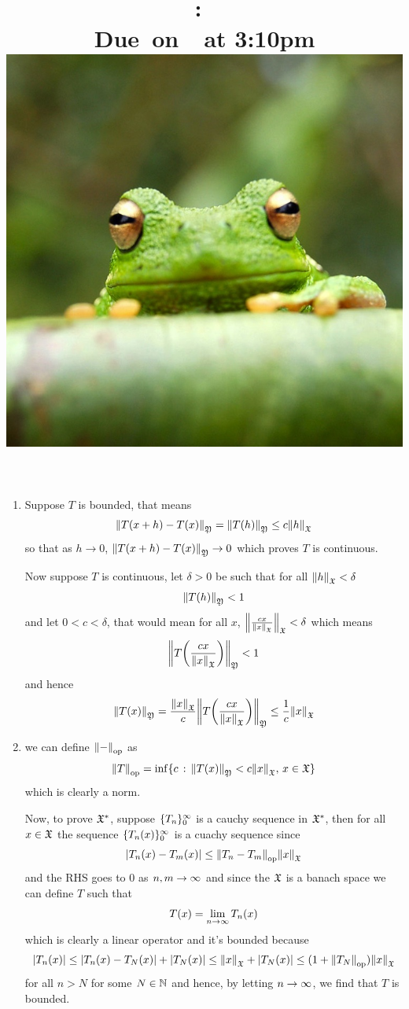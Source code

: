 \documentclass{article}
\title{
    \vspace{2in}
    \textmd{\textbf{\hmwkClass:\ \hmwkTitle}}\\
    \normalsize\vspace{0.1in}\small{Due\ on\ \hmwkDueDate\ at 3:10pm}\\
    \includegraphics[scale=0.2]{frog} \\
    \vspace{0.1in}\large{\textit{\hmwkClassTime}}
    \vspace{3in}
}
\author{\hmwkAuthorName}
\date{}
\begin{document}
\maketitle

\pagebreak
\begin{homeworkProblem}
    \begin{enumerate}[label=\alph*.]
        \item Suppose $T$ is bounded, that means
        \[\norm{T(x+h)-T(x)}_{\mfk{Y}}=\norm{T(h)}_\mfk{Y}\leq c\norm{h}_\mfk{X}\]
        so that as $h\to 0$, $\norm{T(x+h)-T(x)}_{\mfk{Y}}\to 0$ which proves $T$ is continuous.

        Now suppose $T$ is continuous, let $\delta>0$ be such that for all $\norm{h}_\mfk{X}<\delta$
        \[\norm{T(h)}_\mfk{Y}<1\]
        and let $0<c<\delta$, that would mean for all $x$, $\norm{\frac{cx}{\norm{x}_\mfk{X}}}_\mfk{X}<\delta$ which means
        \[\norm{T\bigg(\frac{cx}{\norm{x}_\mfk{X}}\bigg)}_\mfk{Y}<1\]
        and hence
        \[\norm{T(x)}_\mfk{Y}=\frac{\norm{x}_\mfk{X}}{c}\norm{T\bigg(\frac{cx}{\norm{x}_\mfk{X}}\bigg)}_\mfk{Y} \leq \frac{1}{c}\norm{x}_\mfk{X}\]
        \item we can define $\norm{-}_{\operatorname{op}}$ as
        \[\norm{T}_{\operatorname{op}} = \inf\{c\,:\,\norm{T(x)}_\mfk{Y}<c\norm{x}_\mfk{X},\, x\in\mfk{X}\}\]
        which is clearly a norm.

        Now, to prove $\mathfrak{X}^*$, suppose $\{T_n\}_0^\infty$ is a cauchy sequence in $\mathfrak{X}^*$, then for all $x\in\mathfrak{X}$ the sequence $\{T_n(x)\}_0^\infty$ is a cuachy sequence since
        \[\abs{T_n(x)-T_m(x)}\leq \norm{T_n-T_m}_{\operatorname{op}}\norm{x}_\mfk{X}\]
        and the RHS goes to 0 as $n,m\to\infty$ and since the $\mathfrak{X}$ is a banach space we can define $T$ such that
        \[T(x)=\lim_{n\to\infty}T_n(x)\]
        which is clearly a linear operator and it's bounded because
        \[\abs{T_n(x)} \leq \abs{T_n(x)-T_N(x)}+\abs{T_N(x)}\leq\norm{x}_\mfk{X}+\abs{T_N(x)} \leq (1+\norm{T_N}_{\operatorname{op}})\norm{x}_\mfk{X}\]
        for all $n>N$ for some $N\in\mathbb{N}$ and hence, by letting $n\to\infty$, we find that $T$ is bounded.
    \end{enumerate}
\end{homeworkProblem}
\end{document}
